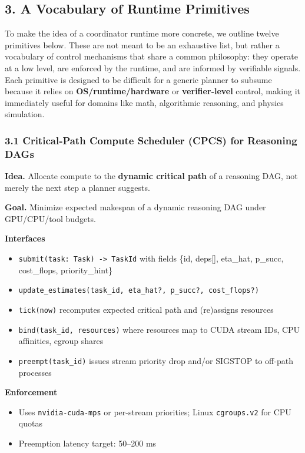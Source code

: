 \documentclass[
]{article}
\begin{document}
\hypertarget{a-vocabulary-of-runtime-primitives}{%
\subsection{3. A Vocabulary of Runtime
Primitives}\label{a-vocabulary-of-runtime-primitives}}

To make the idea of a coordinator runtime more concrete, we outline
twelve primitives below. These are not meant to be an exhaustive list,
but rather a vocabulary of control mechanisms that share a common
philosophy: they operate at a low level, are enforced by the runtime,
and are informed by verifiable signals. Each primitive is designed to be
difficult for a generic planner to subsume because it relies on
\textbf{OS/runtime/hardware} or \textbf{verifier‑level} control, making
it immediately useful for domains like math, algorithmic reasoning, and
physics simulation.

\hypertarget{criticalpath-compute-scheduler-cpcs-for-reasoning-dags}{%
\subsubsection{3.1 Critical‑Path Compute Scheduler (CPCS) for Reasoning
DAGs}\label{criticalpath-compute-scheduler-cpcs-for-reasoning-dags}}

\textbf{Idea.} Allocate compute to the \textbf{dynamic critical path} of
a reasoning DAG, not merely the next step a planner suggests.

\textbf{Goal.} Minimize expected makespan of a dynamic reasoning DAG
under GPU/CPU/tool budgets.

\textbf{Interfaces}
\begin{itemize}
\item \texttt{submit(task: Task) -> TaskId} with fields
  \{id, deps[], eta\_hat, p\_succ, cost\_flops, priority\_hint\}
\item \texttt{update\_estimates(task\_id, eta\_hat?, p\_succ?, cost\_flops?)}
\item \texttt{tick(now)} recomputes expected critical path and
  (re)assigns resources
\item \texttt{bind(task\_id, resources)} where resources map to CUDA
  stream IDs, CPU affinities, cgroup shares
\item \texttt{preempt(task\_id)} issues stream priority drop and/or
  SIGSTOP to off-path processes
\end{itemize}

\textbf{Enforcement}
\begin{itemize}
\item Uses \texttt{nvidia-cuda-mps} or per-stream priorities; Linux
  \texttt{cgroups.v2} for CPU quotas
\item Preemption latency target: 50--200 ms
\end{itemize}
\end{document}
